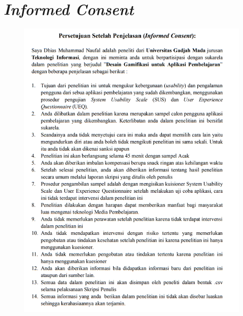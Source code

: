 \section{\textit{Informed Consent}}
\begin{figure}[H]
	\centering
	\includegraphics[width=\textwidth]{contents/appendix/Inform1.png}
	\label{Fig:Informed Concent}
\end{figure}
\newpage
